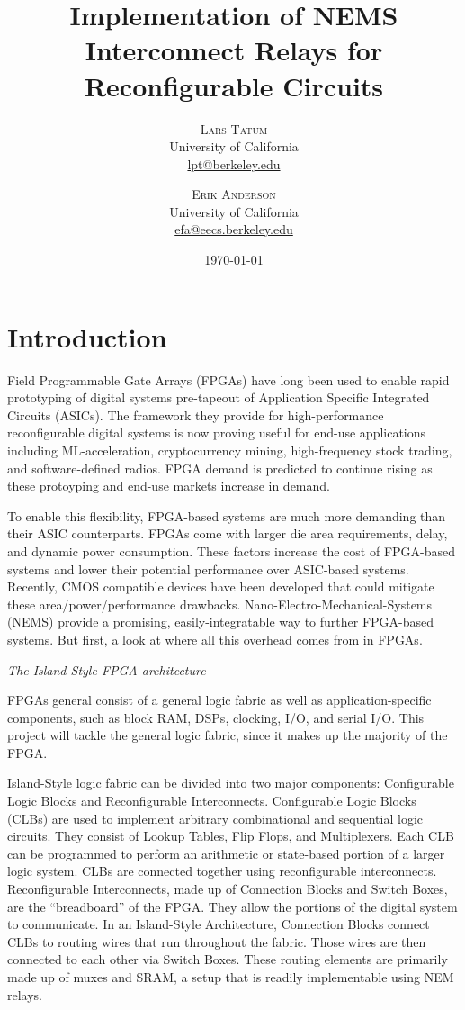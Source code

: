 \documentclass[twoside,twocolumn]{article}
\title{Implementation of NEMS Interconnect Relays for Reconfigurable Circuits} %
\author{%
\textsc{Lars Tatum}\\[1ex] %
\normalsize University of California \\ %
\normalsize \href{mailto:lpt@berkeley.edu}{lpt@berkeley.edu} %
\and %
\textsc{Erik Anderson}\\[1ex] %
\normalsize University of California \\ %
\normalsize \href{mailto:efa@eecs.berkeley.edu}{efa@eecs.berkeley.edu} %
}
\date{\today} %
\begin{document}
\maketitle


\section{Introduction}
Field Programmable Gate Arrays (FPGAs) have long been used to enable rapid prototyping of digital systems pre-tapeout of Application Specific Integrated Circuits (ASICs). The framework they provide for high-performance reconfigurable digital systems is now proving useful for end-use applications including ML-acceleration, cryptocurrency mining, high-frequency stock trading, and software-defined radios. FPGA demand is predicted to continue rising as these protoyping and end-use markets increase in demand.

To enable this flexibility, FPGA-based systems are much more demanding than their ASIC counterparts. FPGAs come with larger die area requirements, delay, and dynamic power consumption. These factors increase the cost of FPGA-based systems and lower their potential performance over ASIC-based systems. Recently, CMOS compatible devices have been developed that could mitigate these area/power/performance drawbacks.  Nano-Electro-Mechanical-Systems (NEMS) provide a promising, easily-integratable way to further FPGA-based systems. But first, a look at where all this overhead comes from in FPGAs.

\textit{The Island-Style FPGA architecture}

FPGAs general consist of a general logic fabric as well as application-specific components, such as block RAM, DSPs, clocking, I/O, and serial I/O. This project will tackle the general logic fabric, since it makes up the majority of the FPGA.

Island-Style logic fabric can be divided into two major components: Configurable Logic Blocks and Reconfigurable Interconnects. Configurable Logic Blocks (CLBs) are used to implement arbitrary combinational and sequential logic circuits. They consist of Lookup Tables, Flip Flops, and Multiplexers. Each CLB can be programmed to perform an arithmetic or state-based portion of a larger logic system. CLBs are connected together using reconfigurable interconnects. Reconfigurable Interconnects, made up of Connection Blocks and Switch Boxes, are the “breadboard” of the FPGA. They allow the portions of the digital system to communicate. In an Island-Style Architecture, Connection Blocks connect CLBs to routing wires that run throughout the fabric. Those wires are then connected to each other via Switch Boxes. These routing elements are primarily made up of muxes and SRAM, a setup that is readily implementable using NEM relays.
\end{document}
